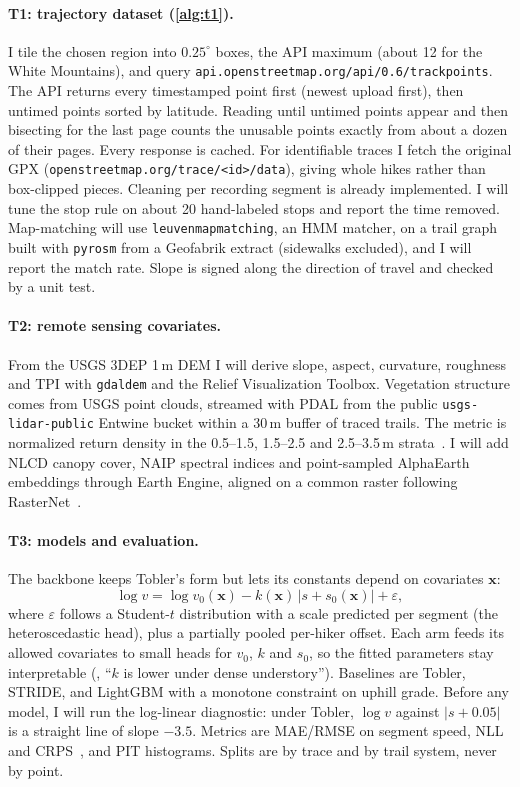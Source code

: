 \documentclass[10pt,twocolumn,letterpaper]{article}
\begin{document}
\paragraph{T1: trajectory dataset (\cref{alg:t1}).}
I tile the chosen region into $0.25^\circ$ boxes, the API maximum (about 12 for the White Mountains), and query \nolinkurl{api.openstreetmap.org/api/0.6/trackpoints}. The API returns every timestamped point first (newest upload first), then untimed points sorted by latitude. Reading until untimed points appear and then bisecting for the last page counts the unusable points exactly from about a dozen of their pages. Every response is cached. For identifiable traces I fetch the original GPX (\nolinkurl{openstreetmap.org/trace/<id>/data}), giving whole hikes rather than box-clipped pieces. Cleaning per recording segment is already implemented. I will tune the stop rule on about 20 hand-labeled stops and report the time removed. Map-matching will use \texttt{leuvenmapmatching}, an HMM matcher, on a trail graph built with \texttt{pyrosm} from a Geofabrik extract (sidewalks excluded), and I will report the match rate. Slope is signed along the direction of travel and checked by a unit test.

\paragraph{T2: remote sensing covariates.}
From the USGS 3DEP 1\,m DEM I will derive slope, aspect, curvature, roughness and TPI with \texttt{gdaldem} and the Relief Visualization Toolbox. Vegetation structure comes from USGS point clouds, streamed with PDAL from the public \texttt{usgs-lidar-public} Entwine bucket within a 30\,m buffer of traced trails. The metric is normalized return density in the 0.5--1.5, 1.5--2.5 and 2.5--3.5\,m strata~\cite{campbell2018understory}. I will add NLCD canopy cover, NAIP spectral indices and point-sampled AlphaEarth embeddings through Earth Engine, aligned on a common raster following RasterNet~\cite{hadzic2020rasternet}.

\paragraph{T3: models and evaluation.}
The backbone keeps Tobler's form but lets its constants depend on covariates $\mathbf{x}$:
\begin{equation}
\log v = \log v_0(\mathbf{x}) - k(\mathbf{x})\,|s + s_0(\mathbf{x})| + \varepsilon,
\end{equation}
where $\varepsilon$ follows a Student-$t$ distribution with a scale predicted per segment (the heteroscedastic head), plus a partially pooled per-hiker offset. Each arm feeds its allowed covariates to small heads for $v_0$, $k$ and $s_0$, so the fitted parameters stay interpretable (\eg, ``$k$ is lower under dense understory''). Baselines are Tobler, STRIDE, and LightGBM with a monotone constraint on uphill grade. Before any model, I will run the log-linear diagnostic: under Tobler, $\log v$ against $|s+0.05|$ is a straight line of slope $-3.5$. Metrics are MAE/RMSE on segment speed, NLL and CRPS~\cite{gneiting2007strictly}, and PIT histograms. Splits are by trace and by trail system, never by point.
\end{document}
